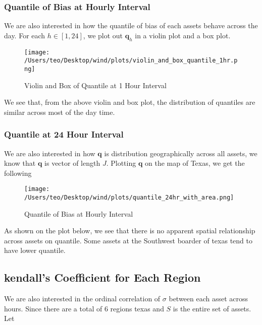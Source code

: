 \documentclass[
]{article}
\begin{document}
\hypertarget{quantile-of-bias-at-hourly-interval}{%
\subsubsection{Quantile of Bias at Hourly
Interval}\label{quantile-of-bias-at-hourly-interval}}

We are also interested in how the quantile of bias of each assets behave
across the day. For each \(h \in [1,24]\), we plot out \(\mathbf{q}_h\)
in a violin plot and a box plot.

\begin{figure}
\centering
\texttt{[image: /Users/teo/Desktop/wind/plots/violin\_and\_box\_quantile\_1hr.png]}
\caption{Violin and Box of Quantile at 1 Hour Interval}
\end{figure}

We see that, from the above violin and box plot, the
distribution of quantiles are similar across most of the day time.

\hypertarget{quantile-at-24-hour-interval}{%
\subsubsection{Quantile at 24 Hour
Interval}\label{quantile-at-24-hour-interval}}

We are also interested in how \(\mathbf{q}\) is distribution
geographically across all assets, we know that \(\mathbf{q}\) is vector
of length \(J\). Plotting \(\mathbf{q}\) on the map of Texas, we get the
following

\begin{figure}
\centering
\texttt{[image: /Users/teo/Desktop/wind/plots/quantile\_24hr\_with\_area.png]}
\caption{Quantile of Bias at Hourly
Interval}
\end{figure}

As shown on the plot below, we see that there is no apparent
spatial relationship across assets on quantile. Some assets at the
Southwest boarder of texas tend to have lower quantile.

\hypertarget{kendalls-coefficient-for-each-region}{%
\subsection{kendall's Coefficient for Each
Region}\label{kendalls-coefficient-for-each-region}}

We are also interested in the ordinal correlation of \(\sigma\) between
each asset across hours. Since there are a total of 6 regions texas and
\(S\) is the entire set of assets. Let
\end{document}

